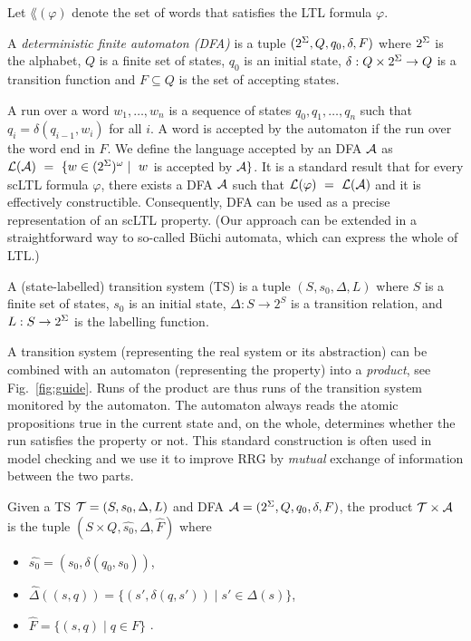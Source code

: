 Let $\lang(\varphi)$ denote the set of words that satisfies the LTL formula $\varphi$.

\begin{definition}\label{def:buchi}
    A \emph{deterministic finite automaton (DFA)} is a tuple $(2^\Sigma,Q,q_0,\delta,F)$ where $2^\Sigma$ is the alphabet, $Q$ is a finite set of states, $q_0$ is an initial state, $\delta : Q \times 2^\Sigma \rightarrow Q$ is a transition function and $F\subseteq Q$ is the set of accepting states.
\end{definition}


A run over a word $w_1,\ldots,w_n$ is a sequence of states $q_0,q_1,\ldots,q_n$ such that $q_{i} = \delta(q_{i-1},w_i)$ for all $i$. 
A word is accepted by the automaton if the run over the word end in $F$. 
We define the language accepted by an DFA $\mathcal{A}$ as $\lang(\ba)~=~\{w\in (\alphabet)^\omega \mid\ w$ is accepted by $\mathcal{A}\}$.
It is a standard result that for every scLTL formula $\varphi$, there exists a DFA $\mathcal{A}$ such that $\mathcal{L}(\varphi)~=~\mathcal{L}(\mathcal{A})$ and it is effectively constructible.
Consequently, DFA can be used as a precise representation of an scLTL property.
(Our approach can be extended in a straightforward way to so-called B\"uchi automata, which can express the whole of LTL.)



\begin{definition}
A (state-labelled) transition system (TS) is a tuple $(S,s_0,\Delta,L)$ where $S$ is a finite set of states, $s_0$ is an initial state, $\Delta: S \to 2^S$ is a transition relation, and $L:S \to 2^\Sigma$ is the labelling function.
\label{def:ts}
\end{definition}

A transition system (representing the real system or its abstraction) can be combined with an automaton (representing the property) into a \emph{product}, see Fig.~\ref{fig:guide}.
Runs of the product are thus runs of the transition system monitored by the automaton.
The automaton always reads the atomic propositions true in the current state and, on the whole, determines whether the run satisfies the property or not.
This standard construction is often used in model checking \cite{BK08} and we use it to improve RRG by  \emph{mutual} exchange of information between the two parts.

\begin{definition}[Product]\label{def:product}
    Given a TS $\mathcal T=(S,s_0,\Delta,L)$ and DFA $\mathcal{A}=(2^\Sigma,Q,q_0,\delta,F)$, the product $\mathcal T\times\mathcal{A}$ is the tuple $(S\times Q,\hat{s_0},\hat{\Delta},\hat F)$ where
    \begin{itemize}
        \item $\hat{s_0}=(s_0,\delta(q_0,s_0))$,
        \item $\hat{\Delta}((s,q))=\{(s',\delta(q,s'))\mid s'\in\Delta(s)\}$,
        \item $\hat F=\{(s,q)\mid q\in F\}$ .
    \end{itemize}
\end{definition}


